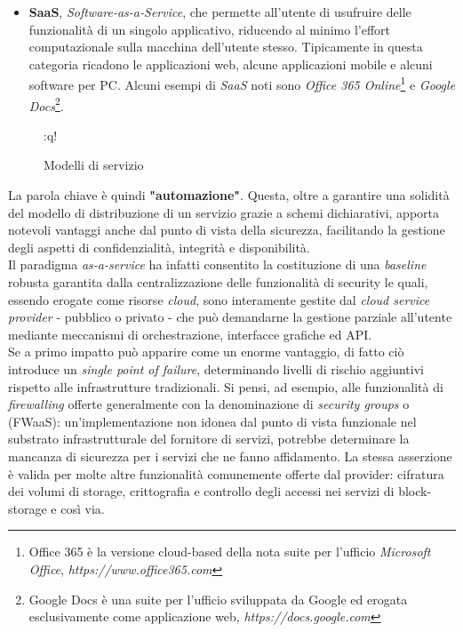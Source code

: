 \documentclass[../main.tex]{subfiles}
\begin{document}
\begin{itemize}
    \item \textbf{SaaS}, \textit{Software-as-a-Service}, che permette all'utente di usufruire delle funzionalità di un singolo applicativo, riducendo al minimo l'effort computazionale sulla macchina dell'utente stesso. Tipicamente in questa categoria ricadono le applicazioni web, alcune applicazioni mobile e alcuni software per PC. Alcuni esempi di \textit{SaaS} noti sono \textit{Office 365 Online}\footnote{Office 365 è la versione cloud-based della nota suite per l'ufficio \textit{Microsoft Office}, \textit{https://www.office365.com}} e \textit{Google Docs}\footnote{Google Docs è una suite per l'ufficio sviluppata da Google ed erogata esclusivamente come applicazione web, \textit{https://docs.google.com}}.
\end{itemize}
\begin{figure}[H]
\centering
{}:q!
\caption{Modelli di servizio}\label{fig:modelliservizio}
\end{figure}




La parola chiave è quindi \textbf{"automazione"}. Questa, oltre a garantire una solidità del modello di distribuzione di un servizio grazie a schemi dichiarativi, apporta notevoli vantaggi anche dal punto di vista della sicurezza, facilitando la gestione degli aspetti di confidenzialità, integrità e disponibilità.
\\Il paradigma \textit{as-a-service} ha infatti consentito la costituzione di una \textit{baseline} robusta garantita dalla centralizzazione delle funzionalità di security le quali, essendo erogate come risorse \textit{cloud}, sono interamente gestite dal \textit{cloud service provider} - pubblico o privato - che può demandarne la gestione parziale all'utente mediante meccanismi di orchestrazione, interfacce grafiche ed API.
\\Se a primo impatto può apparire come un enorme vantaggio, di fatto ciò introduce un \textit{single point of failure}, determinando livelli di rischio aggiuntivi rispetto alle infrastrutture tradizionali. Si pensi, ad esempio, alle funzionalità di \textit{firewalling} offerte generalmente con la denominazione di \textit{security groups} o  (FWaaS): un'implementazione non idonea dal punto di vista funzionale nel substrato infrastrutturale del fornitore di servizi, potrebbe determinare la mancanza di sicurezza per i servizi che ne fanno affidamento.
La stessa asserzione è valida per molte altre funzionalità comunemente offerte dal provider: cifratura dei volumi di storage, crittografia e controllo degli accessi nei servizi di block-storage e così via.
\end{document}
